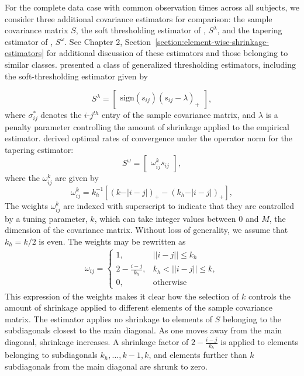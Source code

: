 
For the complete data case with common observation times across all subjects, we consider three additional covariance estimators for comparison: the sample covariance matrix $S$, the soft thresholding estimator of \citet{rothman2009generalized},  $S^\lambda$, and the tapering estimator of \citet{cai2010optimal}, $S^\omega$. See Chapter 2, Section~\ref{section:element-wise-shrinkage-estimators} for additional discussion of these estimators and those belonging to similar classes. \citet{rothman2009generalized} presented a class of generalized thresholding estimators, including the soft-thresholding estimator given by

\[
S^{\lambda}=   \begin{bmatrix} \mbox{sign}\left(s_{ij}\right) \left(s_{ij} - \lambda\right)_+ \end{bmatrix},
\]
\noindent 
where $\sigma^*_{ij}$ denotes the $i$-$j^{th}$ entry of the sample covariance matrix, and $\lambda$ is a penalty parameter controlling the amount of shrinkage applied to the empirical estimator. \citet{cai2010optimal} derived optimal rates of convergence under the operator norm for the tapering estimator:
\[
S^{\omega} =  \begin{bmatrix} \omega_{ij}^k s_{ij} \end{bmatrix},
\]
\noindent
where the $\omega_{ij}^k$ are given by 
\begin{equation*}
\omega^k_{ij} = k_h^{-1} \left[ \left( k - \vert i-j\vert\right)_+ - \left(k_h - \vert i-j\vert\right)_+ \right],
\end{equation*}
\noindent
The weights $\omega^k_{ij}$ are indexed with superscript to indicate that they  are controlled by a tuning parameter, $k$,  which can take integer values between 0 and $M$, the dimension of the covariance matrix.  Without loss of generality,  we assume that $k_h = k/2$ is even. The weights may be rewritten as
\begin{align*}
\omega_{ij} = \left\{\begin{array}{ll} 1, & \vert \vert i -j \vert \vert \le k_h \\
                             2 - \frac{i - j}{k_h}, & k_h < \vert \vert i -j \vert \vert \le k, \\
                             0, & \mbox{otherwise}  \end{array} \right.
\end{align*}
\noindent
This expression of the weights makes it clear how the selection of $k$ controls the amount of shrinkage applied to different elements of the sample covariance matrix. The estimator applies no shrinkage to elements of $S$ belonging to the subdiagonals closest to the main diagonal. As one moves away from the main diagonal, shrinkage increases. A shrinkage factor of $2 - \frac{i - j}{k_h}$ is applied to elements belonging to subdiagonals $k_h,\dots,k-1,k$, and elements further than $k$ subdiagonals from the main diagonal are shrunk to zero.   


